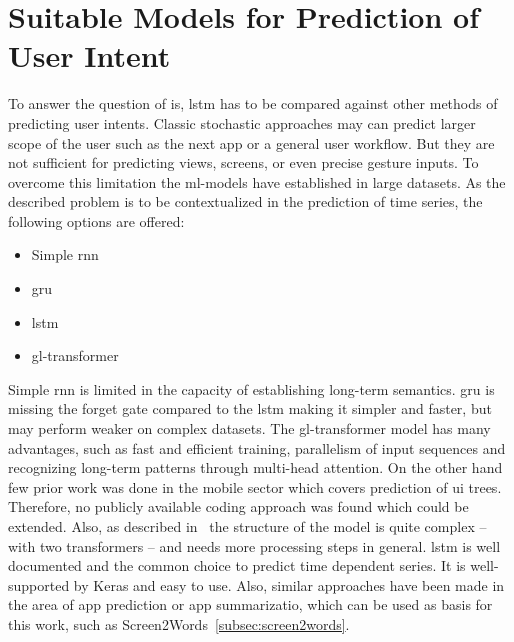 

\section{Suitable Models for Prediction of User Intent}

To answer the question of  is, \gls{lstm} has to be compared against other methods of predicting user intents.
Classic stochastic approaches may can predict larger scope of the user such as the next app or a general user workflow.
But they are not sufficient for predicting views, screens, or even precise gesture inputs.
To overcome this limitation the \gls{ml}-models have established in large datasets.
As the described problem is to be contextualized in the prediction of time series, the following options are offered:
\begin{itemize}
    \item Simple \gls{rnn}
    \item \gls{gru}
    \item \gls{lstm}
    \item \gls{gl-transformer}
\end{itemize}

Simple \gls{rnn} is limited in the capacity of establishing long-term semantics.
\gls{gru} is missing the forget gate compared to the \gls{lstm} making it simpler and faster, but may perform weaker on complex datasets.
The \gls{gl-transformer} model has many advantages, such as fast and efficient training, parallelism of input sequences and recognizing long-term patterns through multi-head attention.
On the other hand few prior work was done in the mobile sector which covers prediction of \gls{ui} trees.
Therefore, no publicly available coding approach was found which could be extended.
Also, as described in~\cite{zhou2021large} the structure of the model is quite complex -- with two transformers -- and needs more processing steps in general.
\gls{lstm} is well documented and the common choice to predict time dependent series.
It is well-supported by Keras and easy to use.
Also, similar approaches have been made in the area of app prediction or app summarizatio, which can be used as basis for this work, such as Screen2Words~\ref{subsec:screen2words}.


